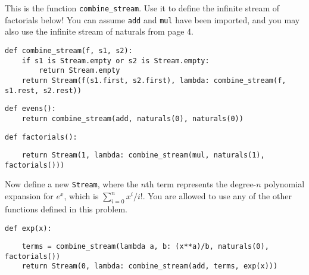 \question This is the function \lstinline$combine_stream$.
Use it to define the infinite stream of factorials below!
You can assume \lstinline$add$ and \lstinline$mul$ have been imported, and
you may also use the infinite stream of naturals from page 4.

\begin{lstlisting}
def combine_stream(f, s1, s2):
    if s1 is Stream.empty or s2 is Stream.empty:
        return Stream.empty
    return Stream(f(s1.first, s2.first), lambda: combine_stream(f, s1.rest, s2.rest))
\end{lstlisting}

\begin{lstlisting}
def evens():
    return combine_stream(add, naturals(0), naturals(0))
\end{lstlisting}

\begin{lstlisting}
def factorials():
\end{lstlisting}
\begin{solution}[2cm]
\begin{lstlisting}
    return Stream(1, lambda: combine_stream(mul, naturals(1), factorials()))
\end{lstlisting}
\end{solution}

Now define a new \lstinline$Stream$, where the $n$th term represents the
degree-$n$ polynomial expansion for $e^x$, which is $\sum_{i=0}^{n} x^i / i!$.
You are allowed to use any of the other functions defined in this problem.

\begin{lstlisting}
def exp(x):
\end{lstlisting}
\begin{solution}[2cm]
\begin{lstlisting}
    terms = combine_stream(lambda a, b: (x**a)/b, naturals(0), factorials())
    return Stream(0, lambda: combine_stream(add, terms, exp(x)))
\end{lstlisting}
\end{solution}

